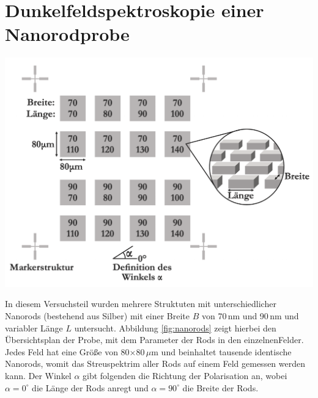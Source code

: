 \newpage
\section{Dunkelfeldspektroskopie einer Nanorodprobe}
\label{sec:nanorods}

\begin{center}
    \captionsetup{type = figure}
    \includegraphics[width = \textwidth]{Bilder/Nanorods.png}
    \label{fig:nanorods}
\end{center}

In diesem Versuchsteil wurden mehrere Struktuten mit unterschiedlicher Nanorods (bestehend aus Silber) mit einer Breite $B$ von 70\,nm und 90\,nm und variabler Länge $L$ untersucht. Abbildung \ref{fig:nanorods} zeigt hierbei den Übersichtsplan der Probe, mit dem Parameter der Rods in den einzelnenFelder. Jedes Feld hat eine Größe von 80$\times$80\,$\mu$m und beinhaltet tausende identische Nanorods, womit das Streuspektrim aller Rods auf einem Feld gemessen werden kann. Der Winkel $\alpha$ gibt folgenden die Richtung der Polarisation an, wobei $\alpha = 0^\circ$ die Länge der Rods anregt und $\alpha = 90^\circ$ die Breite der Rods. \cite{Anleitung}
\bigskip

